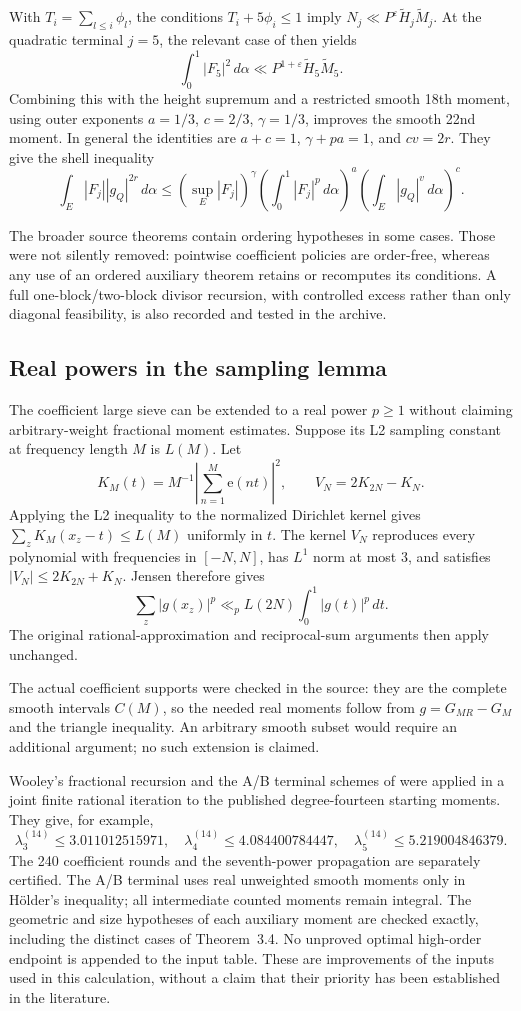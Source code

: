 \documentclass[11pt,letterpaper]{article}
\theoremstyle{remark}
\newcommand{\eps}{\varepsilon}
\newcommand{\dd}{\,d\alpha}
\newcommand{\e}{\mathrm e}
\newcommand{\CoefficientThree}{3.011012515971}
\newcommand{\CoefficientFour}{4.084400784447}
\newcommand{\CoefficientFive}{5.219004846379}
\begin{document}
With $T_i=\sum_{l\le i}\phi_l$, the conditions
$T_i+5\phi_i\le1$ imply $N_j\ll P^\eps\widetilde H_j\widetilde M_j$.
At the quadratic terminal $j=5$, the relevant case of \cite[Lemma~3.3]{VW95}
then yields
\[
 \int_0^1|F_5|^2\dd\ll P^{1+\eps}\widetilde H_5\widetilde M_5.
\]
Combining this with the height supremum and a restricted smooth 18th moment,
using outer exponents $a=1/3$, $c=2/3$, $\gamma=1/3$, improves the smooth 22nd
moment. In general the identities are $a+c=1$, $\gamma+pa=1$, and $cv=2r$.
They give the shell inequality
\[
 \int_E|F_j||g_Q|^{2r}\dd\le
 (\sup_E|F_j|)^\gamma
 (\int_0^1|F_j|^p\dd)^a(\int_E|g_Q|^v\dd)^c.
\]

The broader source theorems contain ordering hypotheses in some cases. Those were
not silently removed: pointwise coefficient policies are order-free, whereas any
use of an ordered auxiliary theorem retains or recomputes its conditions. A full
one-block/two-block divisor recursion, with controlled excess rather than only
diagonal feasibility, is also recorded and tested in the archive.

\subsection{Real powers in the sampling lemma}

The coefficient large sieve can be extended to a real power $p\ge1$ without claiming
arbitrary-weight fractional moment estimates. Suppose its L2 sampling constant at
frequency length $M$ is $L(M)$. Let
\[
 K_M(t)=M^{-1}\left|\sum_{n=1}^M\e(nt)\right|^2,
 \qquad V_N=2K_{2N}-K_N.
\]
Applying the L2 inequality to the normalized Dirichlet kernel gives
$\sum_zK_M(x_z-t)\le L(M)$ uniformly in $t$.
The kernel $V_N$ reproduces every polynomial with frequencies in $[-N,N]$,
has $L^1$ norm at most 3, and satisfies $|V_N|\le2K_{2N}+K_N$. Jensen therefore gives
\[
 \sum_z|g(x_z)|^p\ll_p L(2N)\int_0^1|g(t)|^p\,dt.
\]
The original rational-approximation and reciprocal-sum arguments then apply unchanged.

The actual coefficient supports were checked in the source: they are the complete
smooth intervals $C(M)$, so the needed real moments follow from
$g=G_{MR}-G_M$ and the triangle inequality. An arbitrary smooth subset would require
an additional argument; no such extension is claimed.

Wooley's fractional recursion \cite[Lemma~1]{W00} and the A/B terminal schemes
of \cite[Theorem~3.4 and Section~4]{VW00} were applied in a joint finite rational
iteration to the published degree-fourteen starting moments. They give, for example,
\[
 \lambda^{(14)}_3\le\CoefficientThree,\quad
 \lambda^{(14)}_4\le\CoefficientFour,\quad
 \lambda^{(14)}_5\le\CoefficientFive.
\]
The 240 coefficient rounds and the seventh-power propagation are separately certified.
The A/B terminal uses real unweighted smooth moments only in H\"older's inequality;
all intermediate counted moments remain integral. The geometric and size hypotheses
of each auxiliary moment are checked exactly, including the distinct cases of
Theorem~3.4. No unproved optimal high-order endpoint is appended to the input table.
These are improvements of the inputs used in this calculation, without a claim
that their priority has been established in the literature.
\end{document}
